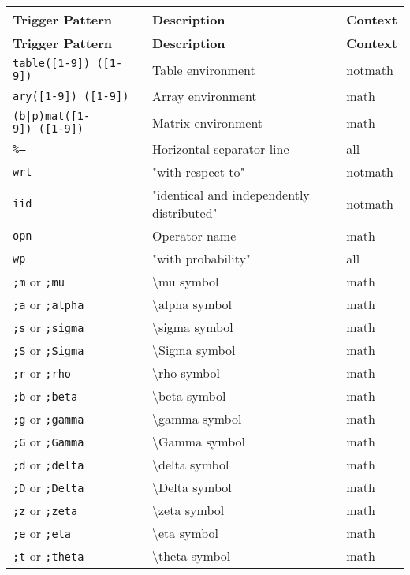 \documentclass{article}
\begin{document}
\begin{longtable}{|p{}|p{}|p{}|}
\hline
\textbf{Trigger Pattern} & \textbf{Description} & \textbf{Context} \\
\hline
\endfirsthead
\hline
\textbf{Trigger Pattern} & \textbf{Description} & \textbf{Context} \\
\hline
\endhead
\hline
\endfoot

\texttt{table([1-9])\ ([1-9])} & Table environment & notmath \\
\texttt{ary([1-9])\ ([1-9])} & Array environment & math \\
\texttt{(b|p)mat([1-9])\ ([1-9])} & Matrix environment & math \\
\texttt{\%--} & Horizontal separator line & all \\
\texttt{wrt} & "with respect to" & notmath \\
\texttt{iid} & "identical and independently distributed" & notmath \\
\texttt{opn} & Operator name & math \\
\texttt{wp} & "with probability" & all \\
\texttt{;m} or \texttt{;mu} & \textbackslash mu symbol & math \\
\texttt{;a} or \texttt{;alpha} & \textbackslash alpha symbol & math \\
\texttt{;s} or \texttt{;sigma} & \textbackslash sigma symbol & math \\
\texttt{;S} or \texttt{;Sigma} & \textbackslash Sigma symbol & math \\
\texttt{;r} or \texttt{;rho} & \textbackslash rho symbol & math \\
\texttt{;b} or \texttt{;beta} & \textbackslash beta symbol & math \\
\texttt{;g} or \texttt{;gamma} & \textbackslash gamma symbol & math \\
\texttt{;G} or \texttt{;Gamma} & \textbackslash Gamma symbol & math \\
\texttt{;d} or \texttt{;delta} & \textbackslash delta symbol & math \\
\texttt{;D} or \texttt{;Delta} & \textbackslash Delta symbol & math \\
\texttt{;z} or \texttt{;zeta} & \textbackslash zeta symbol & math \\
\texttt{;e} or \texttt{;eta} & \textbackslash eta symbol & math \\
\texttt{;t} or \texttt{;theta} & \textbackslash theta symbol & math \\

\end{longtable}
\end{document}

